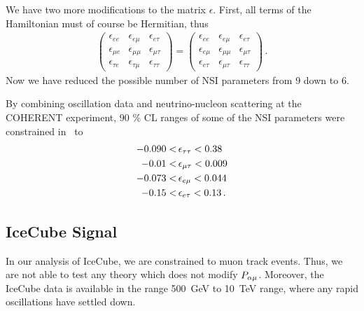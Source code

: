 We have two more modifications to the matrix $\epsilon$. First, all terms of the Hamiltonian must of course be Hermitian, thus
\begin{align}
    \begin{pmatrix}
        \epsilon_{ee} & \epsilon_{e\mu} & \epsilon_{e\tau}  \\
        \epsilon_{\mu e} & \epsilon_{\mu\mu} & \epsilon_{\mu\tau}  \\
        \epsilon_{\tau e} & \epsilon_{\tau\mu} & \epsilon_{\tau\tau}
    \end{pmatrix} =
    \begin{pmatrix}
        \epsilon_{ee} & \epsilon_{e\mu} & \epsilon_{e\tau}  \\
        \epsilon_{e \mu} & \epsilon_{\mu\mu} & \epsilon_{\mu\tau}  \\
        \epsilon_{e\tau} & \epsilon_{\mu\tau} & \epsilon_{\tau\tau}
    \end{pmatrix}\,.
\end{align}
Now we have reduced the possible number of NSI parameters from 9 down to 6. 

By combining oscillation data and neutrino-nucleon scattering at the COHERENT experiment, 90 \% CL ranges of some of 
the NSI parameters were constrained in~\cite{coherent} to
\begin{align}\label{eq:coherentbounds}
    -0.090 < &\,\epsilon_{\tau\tau} < 0.38 \nonumber \\
    -0.01 < &\,\epsilon_{\mu\tau} < 0.009 \nonumber \\
    -0.073 < &\,\epsilon_{e\mu} < 0.044 \nonumber \\
    -0.15 < &\,\epsilon_{e\tau} < 0.13\,.
\end{align}


\subsection{IceCube Signal}
In our analysis of IceCube, we are constrained to muon track events. Thus, we are not able to test any theory which does not modify $P_{\alpha \mu}$. Moreover,
the IceCube data is available in the range \SI{500}{\GeV} to \SI{10}{\TeV} range, where any rapid oscillations have settled down.

